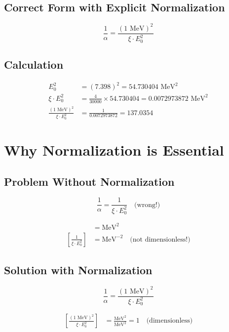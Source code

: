 	\subsection*{Correct Form with Explicit Normalization}
	
	\[
	\boxed{\frac{1}{\alpha} = \frac{(1 \text{ MeV})^2}{\xi \cdot E_0^2}}
	\]
	
	\subsection*{Calculation}
	
	\begin{align*}
		E_0^2 &= (7.398)^2 = 54.730404 \text{ MeV}^2 \\
		\xi \cdot E_0^2 &= \tfrac{4}{30000} \times 54.730404 = 0.0072973872 \text{ MeV}^2 \\
		\frac{(1 \text{ MeV})^2}{\xi \cdot E_0^2} &= \frac{1}{0.0072973872} = 137.0354
	\end{align*}
	
	\section*{Why Normalization is Essential}
	
	\subsection*{Problem Without Normalization}
	
	\[
	\frac{1}{\alpha} = \frac{1}{\xi \cdot E_0^2} \quad \text{(wrong!)}
	\]
	
	\begin{align*}
		[\xi \cdot E_0^2] &= \text{MeV}^2 \\
		\left[\frac{1}{\xi \cdot E_0^2}\right] &= \text{MeV}^{-2} \quad \text{(not dimensionless!)}
	\end{align*}
	
	\subsection*{Solution with Normalization}
	
	\[
	\frac{1}{\alpha} = \frac{(1 \text{ MeV})^2}{\xi \cdot E_0^2}
	\]
	
	\begin{align*}
		\left[\frac{(1 \text{ MeV})^2}{\xi \cdot E_0^2}\right] &= \frac{\text{MeV}^2}{\text{MeV}^2} = 1 \quad \text{(dimensionless)}
	\end{align*}
	
